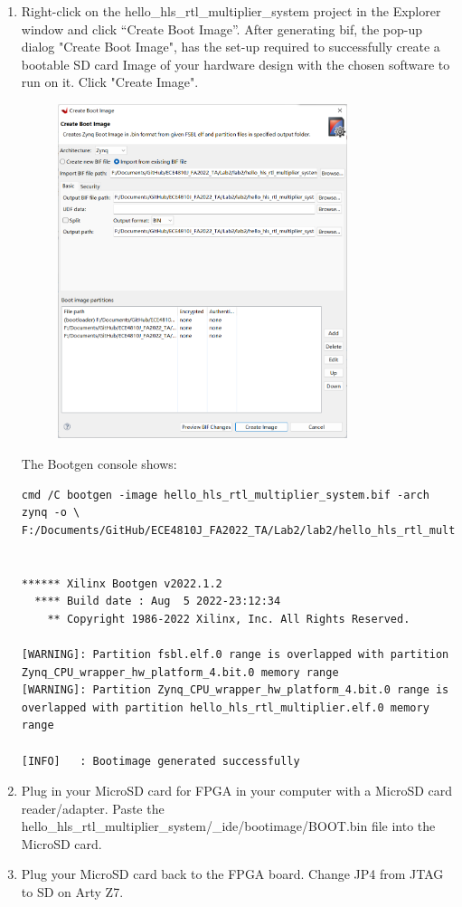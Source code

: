 \documentclass[a4paper,12pt,twoside]{article}
\begin{document}
\begin{enumerate}
    \item Right-click on the hello\_hls\_rtl\_multiplier\_system project in the Explorer window and click “Create Boot Image”. After generating bif, the pop-up dialog "Create Boot Image", has the set-up required to successfully create a bootable SD card Image of your hardware design with the chosen software to run on it. Click "Create Image".
    \begin{figure}[H]
        \centering
        \includegraphics[width=0.8\textwidth]{images/5.png}
    \end{figure}
    The Bootgen console shows:
    \begin{verbatim}
cmd /C bootgen -image hello_hls_rtl_multiplier_system.bif -arch zynq -o \
F:/Documents/GitHub/ECE4810J_FA2022_TA/Lab2/lab2/hello_hls_rtl_multiplier_system/_ide/bootimage/BOOT.bin 


****** Xilinx Bootgen v2022.1.2
  **** Build date : Aug  5 2022-23:12:34
    ** Copyright 1986-2022 Xilinx, Inc. All Rights Reserved.

[WARNING]: Partition fsbl.elf.0 range is overlapped with partition Zynq_CPU_wrapper_hw_platform_4.bit.0 memory range
[WARNING]: Partition Zynq_CPU_wrapper_hw_platform_4.bit.0 range is overlapped with partition hello_hls_rtl_multiplier.elf.0 memory range

[INFO]   : Bootimage generated successfully
    \end{verbatim}
    \item Plug in your MicroSD card for FPGA in your computer with a MicroSD card reader/adapter. Paste the hello\_hls\_rtl\_multiplier\_system/\_ide/bootimage/BOOT.bin file into the MicroSD card.
    \item Plug your MicroSD card back to the FPGA board. Change JP4 from JTAG to SD on Arty Z7.
\end{enumerate}
\end{document}
